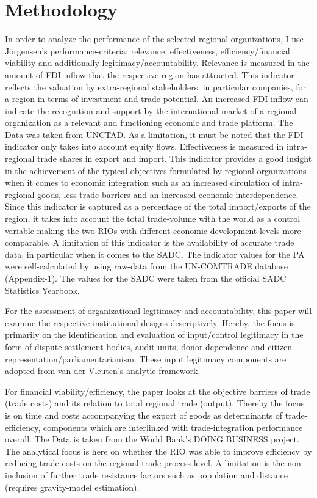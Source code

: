 \section{Methodology}

In order to analyze the performance of the selected regional organizations, I use Jörgensen’s   performance-criteria: relevance, effectiveness, efficiency/financial viability and additionally legitimacy/accountability. Relevance is measured in the amount of FDI-inflow that the respective region has attracted. This indicator reflects the valuation by extra-regional stakeholders, in particular companies, for a region in terms of investment and trade potential.  An increased FDI-inflow can indicate the recognition and support by the international market of a regional organization as a relevant and functioning economic and trade platform. The Data was taken from UNCTAD. As a limitation, it must be noted that the FDI indicator only takes into account equity flows.
Effectiveness is measured in intra-regional trade shares in export and import. This indicator provides a good insight in the achievement of the typical objectives formulated by regional organizations when it comes to economic integration such as an increased circulation of intra-regional goods, less trade barriers and an increased economic interdependence. Since this indicator is captured as a percentage of the total import/exports of the region, it takes into account the total trade-volume with the world as a control variable making the two RIOs with different economic development-levels more comparable. A limitation of this indicator is the availability of accurate trade data, in particular when it comes to the SADC. The indicator values for the PA were self-calculated by using raw-data from the UN-COMTRADE database (Appendix-1). The values for the SADC were taken from the official SADC Statistics Yearbook.  

For the assessment of organizational legitimacy and accountability, this paper will examine the respective institutional designs descriptively. Hereby, the focus is primarily on the identification and evaluation of input/control legitimacy in the form of dispute-settlement bodies, audit units, donor dependence and citizen representation/parliamentarianism. These input legitimacy components are adopted from van der Vleuten’s analytic framework. 
    
For financial viability/efficiency, the paper looks at the objective barriers of trade (trade costs) and its relation to total regional trade (output). Thereby the focus is on time and costs accompanying the export of goods as determinants of trade-efficiency, components which are interlinked with trade-integration performance overall. The Data is taken from the World Bank’s DOING BUSINESS project. The analytical focus is here on whether the RIO was able to improve efficiency by reducing trade costs on the regional trade process level. A limitation is the non-inclusion of further trade resistance factors such as population and distance (requires gravity-model estimation).

